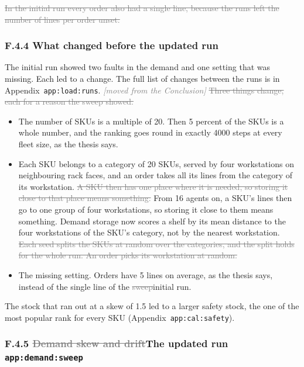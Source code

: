 \documentclass[11pt,a4paper]{article}
\newcommand{\new}[1]{\textcolor{newc}{#1}}
\newcommand{\old}[1]{\textcolor{gray}{\sout{#1}}}
\newcommand{\lref}[1]{{\small\texttt{#1}}}
\newcommand{\moved}[1]{{\small\textcolor{gray}{\emph{[moved from #1]}}}}
\begin{document}
\old{In the initial run every order also had a single line, because the runs
left the number of lines per order unset.}

\subsubsection*{\new{F.4.4 What changed before the updated run}}

\new{The initial run showed two faults in the demand and one setting that was
missing. Each led to a change. The full list of changes between the runs is
in Appendix~\lref{app:load:runs}.} \moved{the Conclusion}
\old{Three things change, each for a reason the sweep showed.}
\begin{itemize}
  \item The number of SKUs is a multiple of 20. Then 5 percent of the SKUs is
  a whole number, and the ranking goes round in exactly 4000 steps at every
  fleet size, as the thesis says.
  \item Each SKU belongs to a category of 20 SKUs, served by four
  workstations on neighbouring rack faces, and an order takes all its lines
  from the category of its workstation. \old{A SKU then has one place where
  it is needed, so storing it close to that place means something.}
  \new{From 16 agents on, a SKU's lines then go to one group of four
  workstations, so storing it close to them means something. Demand storage
  now scores a shelf by its mean distance to the four workstations of the
  SKU's category, not by the nearest workstation.} \old{Each seed splits the
  SKUs at random over the categories, and the split holds for the whole run.
  An order picks its workstation at random.}
  \item \new{The missing setting.} Orders have 5 lines on average, as the
  thesis says, instead of the single line of the \old{sweep}\new{initial
  run}.
\end{itemize}
\new{The stock that ran out at a skew of 1.5 led to a larger safety stock,
the one of the most popular rank for every SKU
(Appendix~\lref{app:cal:safety}).}

\subsubsection*{F.4.5 \old{Demand skew and drift}\new{The updated run} \hfill\lref{app:demand:sweep}}
\end{document}
